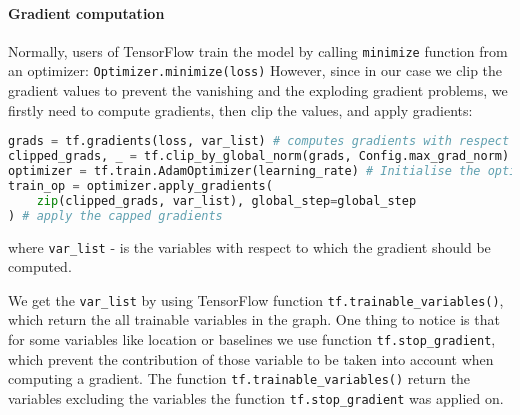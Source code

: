\paragraph{Gradient computation} Normally, users of TensorFlow train the model
by calling \lstinline{minimize} function from an optimizer: \lstinline{Optimizer.minimize(loss)}
However, since in our case we clip the gradient values
to prevent the vanishing and the exploding gradient problems, we firstly
need to compute gradients, then clip the values, and apply gradients:

\begin{lstlisting}[language=Python, caption={gradient computation},label={list:comp_grad}]
grads = tf.gradients(loss, var_list) # computes gradients with respect to var_list
clipped_grads, _ = tf.clip_by_global_norm(grads, Config.max_grad_norm) # clip the values
optimizer = tf.train.AdamOptimizer(learning_rate) # Initialise the optimizer
train_op = optimizer.apply_gradients(
	zip(clipped_grads, var_list), global_step=global_step
) # apply the capped gradients
\end{lstlisting}
where \lstinline{var_list} - is the variables with respect to which the gradient should
be computed.

We get the \lstinline{var_list} by using TensorFlow function \lstinline{tf.trainable_variables()},
which return the all trainable variables in the graph. One thing to notice is
that for some variables like location or baselines we use function \lstinline{tf.stop_gradient},
which prevent the contribution of those variable to be taken into account when computing a
gradient. The function \lstinline{tf.trainable_variables()} return the variables excluding
the variables the function \lstinline{tf.stop_gradient} was applied on.

